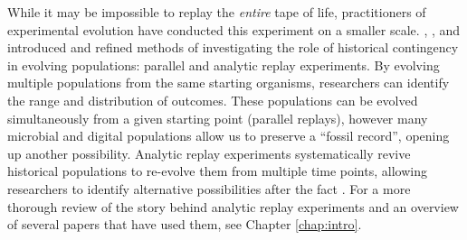While it may be impossible to replay the \textit{entire} tape of life, practitioners of experimental evolution have conducted this experiment on a smaller scale. 
\cite{travisanoExperimentalTestsRoles1995}, \cite{wagenaarInfluenceChanceHistory2004}, and \citet{blountHistoricalContingencyEvolution2008} introduced and refined methods of investigating the role of historical contingency in evolving populations: parallel and analytic replay experiments.
By evolving multiple populations from the same starting organisms, researchers can identify the range and distribution of outcomes.
These populations can be evolved simultaneously from a given starting point (parallel replays), however many microbial and digital populations allow us to preserve a ``fossil record'', opening up another possibility.
Analytic replay experiments systematically revive historical populations to re-evolve them from multiple time points, allowing researchers to identify alternative possibilities after the fact \citep{blountContingencyDeterminismEvolution2018}.
For a more thorough review of the story behind analytic replay experiments and an overview of several papers that have used them, see Chapter \ref{chap:intro}.
